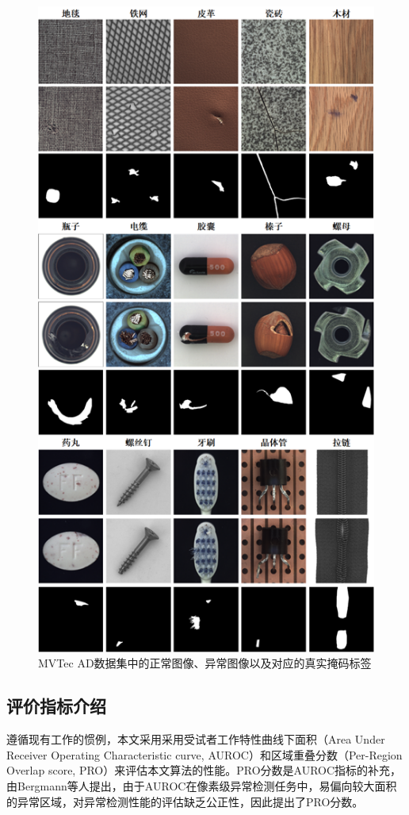 \documentclass[lang=chs, degree=master, blindreview=false, adobe=false]{yanputhesis}
\begin{document}
\begin{figure}[H]
	\centering
	\includegraphics[width=0.77\linewidth]{figs/MVTecAD.png}
	\caption{MVTec AD数据集中的正常图像、异常图像以及对应的真实掩码标签}
	\label{fig:MVTec AD}
\end{figure}

\subsection{评价指标介绍}

遵循现有工作的惯例，本文采用采用受试者工作特性曲线下面积（Area Under Receiver Operating Characteristic curve, AUROC）和区域重叠分数（Per-Region Overlap score, PRO）来评估本文算法的性能。PRO分数是AUROC指标的补充，由Bergmann等人\cite{bergmann2020uninformed}提出，由于AUROC在像素级异常检测任务中，易偏向较大面积的异常区域，对异常检测性能的评估缺乏公正性，因此提出了PRO分数。
\end{document}
